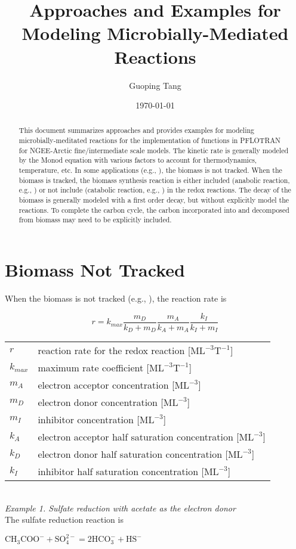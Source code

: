 \documentclass[12pt, a4paper]{article}
\title{Approaches and Examples for Modeling Microbially-Mediated Reactions}
\author{Guoping Tang}
\date\today{}
\begin{document}
\maketitle

\begin{abstract}
This document summarizes approaches and provides examples for modeling microbially-meditated reactions for the implementation of functions in PFLOTRAN for NGEE-Arctic fine/intermediate scale models. The kinetic rate is generally modeled by the Monod equation with various factors to account for thermodynamics, temperature, etc. In some applications (e.g., \cite{Wang2003283, Fang20096029, Yabusaki2007216, Riley2011}), the biomass is not tracked. When the biomass is tracked, the biomass synthesis reaction is either included (anabolic reaction, e.g., \cite{Luo2007129,Istok20101,rittmann2001environmental}) or not include (catabolic reaction, e.g., \cite{Jin20111,Li2009,bethke2007geochemical,Gu2010141}) in the redox reactions. The decay of the biomass is generally modeled with a first order decay, but without explicitly model the reactions. To complete the carbon cycle, the carbon incorporated into and decomposed from biomass may need to be explicitly included.
\end{abstract}

\section{Biomass Not Tracked}
When the biomass is not tracked (e.g., \cite{Wang2003283, Fang20096029, Yabusaki2007216, Riley2011}), the reaction rate is

\begin{equation}  
r = k_{max}\frac{m_D}{k_D + m_D}\frac{m_A}{k_A + m_A}\frac{k_I}{k_I + m_I}
\end{equation}

\begin{tabular}{ll}
$r$ & reaction rate for the redox reaction [$\mathrm{ML^{-3}T^{-1}}$] \\
$k_{max}$ & maximum rate coefficient [$\mathrm{ML^{-3}T^{-1}}$] \\
$m_{A}$ & electron acceptor concentration [$\mathrm{ML^{-3}}$] \\
$m_{D}$ & electron donor concentration [$\mathrm{ML^{-3}}$] \\
$m_{I}$ & inhibitor concentration [$\mathrm{ML^{-3}}$] \\
$k_{A}$ & electron acceptor half saturation concentration [$\mathrm{ML^{-3}}$] \\
$k_{D}$ & electron donor half saturation concentration [$\mathrm{ML^{-3}}$] \\
$k_{I}$ & inhibitor half saturation concentration [$\mathrm{ML^{-3}}$] \\
\end{tabular}
\\
\emph{Example 1. Sulfate reduction with acetate as the electron donor}
\\
The sulfate reduction reaction is
\begin{center}
$\mathrm{CH_3COO^- + SO_4^{2-} = 2 HCO_3^- + HS^-}$
\end{center}
\end{document}
